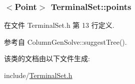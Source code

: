 \subsubsection[{\texorpdfstring{points}{points}}]{$<${\bf Point}$>$ Terminal\+Set\+::points}\hypertarget{classTerminalSet_a08ca403fedfeab1fed1dbf96cf7ec1cb}{}\label{classTerminalSet_a08ca403fedfeab1fed1dbf96cf7ec1cb}


在文件 Terminal\+Set.\+h 第 13 行定义.



参考自 Column\+Gen\+Solve\+::suggest\+Tree().



该类的文档由以下文件生成\+:\begin{DoxyCompactItemize}
\item 
include/\hyperlink{TerminalSet_8h}{Terminal\+Set.\+h}\end{DoxyCompactItemize}
